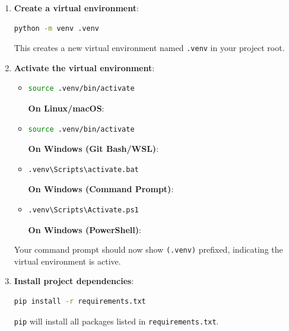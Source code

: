 \documentclass[12pt,a4paper]{article}
\begin{document}
\begin{enumerate}
    \item 
    \textbf{Create a virtual environment}:

    \begin{lstlisting}[language=bash]
python -m venv .venv
\end{lstlisting}

    This creates a new virtual environment named \texttt{.venv} in your project root.

    \item 
    \textbf{Activate the virtual environment}:

    \begin{itemize}
    \item 
    \begin{lstlisting}[language=bash]
source .venv/bin/activate
\end{lstlisting}

    \textbf{On Linux/macOS}:

    \item 
    \begin{lstlisting}[language=bash]
source .venv/bin/activate
\end{lstlisting}

    \textbf{On Windows (Git Bash/WSL)}:

    \item 
    \begin{lstlisting}[language=bash]
.venv\Scripts\activate.bat
\end{lstlisting}

    \textbf{On Windows (Command Prompt)}:

    \item 
    \begin{lstlisting}[language=bash]
.venv\Scripts\Activate.ps1
\end{lstlisting}

    \textbf{On Windows (PowerShell)}:

\end{itemize}

    Your command prompt should now show \texttt{(.venv)} prefixed, indicating the virtual environment is active.

    \item 
    \textbf{Install project dependencies}:

    \begin{lstlisting}[language=bash]
pip install -r requirements.txt
\end{lstlisting}

    \texttt{pip} will install all packages listed in \texttt{requirements.txt}.

\end{enumerate}
\end{document}
